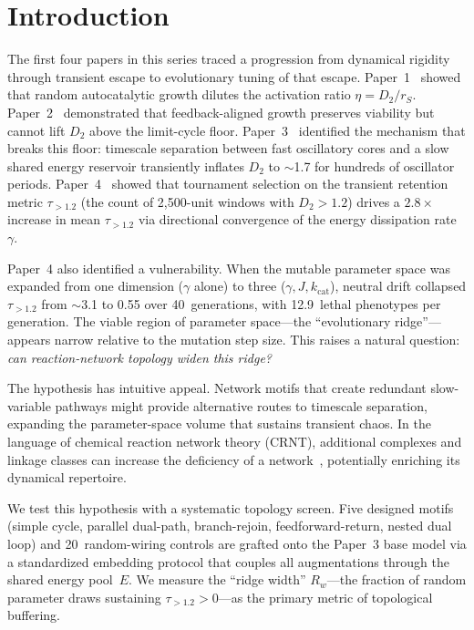 \documentclass[twocolumn,showpacs,preprintnumbers,amsmath,amssymb,prd,floatfix]{revtex4-2}
\newcommand{\tauexp}{\tau_{>1.2}}
\newcommand{\Dtwo}{D_2}
\newcommand{\kcat}{k_{\mathrm{cat}}}
\newcommand{\Rw}{R_w}
\begin{document}
\maketitle

\section{Introduction}
\label{sec:introduction}

The first four papers in this series traced a progression from dynamical rigidity through transient escape to evolutionary tuning of that escape. Paper~1~\cite{paper1} showed that random autocatalytic growth dilutes the activation ratio $\eta = \Dtwo/r_S$. Paper~2~\cite{paper2} demonstrated that feedback-aligned growth preserves viability but cannot lift $\Dtwo$ above the limit-cycle floor. Paper~3~\cite{paper3} identified the mechanism that breaks this floor: timescale separation between fast oscillatory cores and a slow shared energy reservoir transiently inflates $\Dtwo$ to $\sim$1.7 for hundreds of oscillator periods. Paper~4~\cite{paper4} showed that tournament selection on the transient retention metric $\tauexp$ (the count of 2{,}500-unit windows with $\Dtwo > 1.2$) drives a $2.8\times$ increase in mean $\tauexp$ via directional convergence of the energy dissipation rate $\gamma$.

Paper~4 also identified a vulnerability. When the mutable parameter space was expanded from one dimension ($\gamma$ alone) to three ($\gamma, J, \kcat$), neutral drift collapsed $\tauexp$ from $\sim$3.1 to 0.55 over 40~generations, with 12.9~lethal phenotypes per generation. The viable region of parameter space---the ``evolutionary ridge''---appears narrow relative to the mutation step size. This raises a natural question: \textit{can reaction-network topology widen this ridge?}

The hypothesis has intuitive appeal. Network motifs that create redundant slow-variable pathways might provide alternative routes to timescale separation, expanding the parameter-space volume that sustains transient chaos. In the language of chemical reaction network theory (CRNT), additional complexes and linkage classes can increase the deficiency of a network~\cite{feinberg1972, horn1972}, potentially enriching its dynamical repertoire.

We test this hypothesis with a systematic topology screen. Five designed motifs (simple cycle, parallel dual-path, branch-rejoin, feedforward-return, nested dual loop) and 20~random-wiring controls are grafted onto the Paper~3 base model via a standardized embedding protocol that couples all augmentations through the shared energy pool~$E$. We measure the ``ridge width'' $\Rw$---the fraction of random parameter draws sustaining $\tauexp > 0$---as the primary metric of topological buffering.
\end{document}
